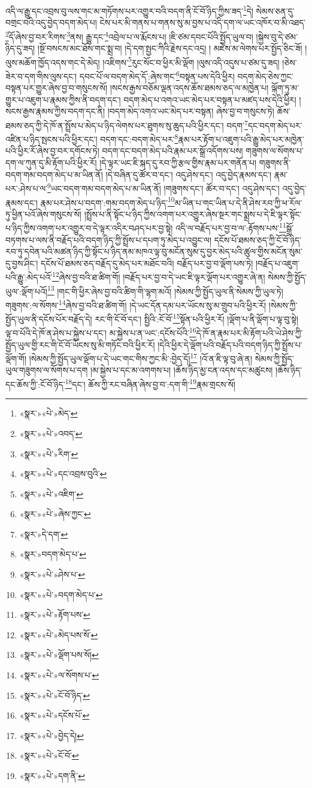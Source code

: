 འདི་ལ་རྒྱུ་དང་འབྲས་བུ་ལས་གང་མ་གཏོགས་པར་འགྱུར་བའི་བདག་ནི་ངོ་བོ་ཉིད་ཀྱིས་ཟད་\footnote{«སྣར་»«པེ་»མེད་}དེ། སེམས་ཅན་དུ་བགྲང་བའི་འདུ་བྱེད་བདག་མེད་པ། ངེས་པར་མི་གནས་པ་གནས་སུ་མ་བྱས་པ་འདི་དག་ལ་ཡང་འཁོར་བ་མི་འཐད་\footnote{«སྣར་»«པེ་»འབད་}དོ་ཞེས་བྱ་བར་རིགས་\footnote{«སྣར་»«པེ་»རིག་}ནས། རྒྱུ་དང་\footnote{«སྣར་»«པེ་»དང་འབྲས་བུའི་}འབྲེལ་པ་ལ་རྨོངས་པ། །ཇི་ཙམ་དབང་པོའི་སྤྱོད་ཡུལ་བ། །སྐྱེས་བུ་དེ་ཙམ་ཉིད་དུ་ཟད། །སྔོ་བསངས་མང་ཐོས་གང་སྨྲ་བ། །དེ་དག་སྤྱང་ཀིའི་རྗེས་དང་འདྲ། །
མཛེས་མ་ལེགས་པར་སྤྱོད་ཅིང་ཟོ། །ལུས་མཆོག་ཁྱོད་འདས་གང་དེ་མེད། །འཇིགས་\footnote{«སྣར་»«པེ་»འཇིག་}རུང་སོང་བ་ཕྱིར་མི་ལྡོག །ལུས་འདི་འདུས་པ་ཙམ་དུ་ཟད། །ཅེས་ཟེར་བ་དག་གིས་ལུས་དང་། དབང་པོ་ལ་བདག་མེད་དོ་:ཞེས་གང་\footnote{«སྣར་»«པེ་»ཞེས་ཀྱང་}བསྟན་པས་དེའི་ཕྱིར། བདག་མེད་ཅེས་ཀྱང་བསྟན་པར་གྱུར་ཞེས་བྱ་བ་གསུངས་སོ། །སངས་རྒྱས་བཅོམ་ལྡན་འདས་ཆོས་ཐམས་ཅད་ལ་མཁྱེན་པ། ལྐོག་ཏུ་མ་གྱུར་པ་འཇུག་པ་རྣམས་ཀྱིས་ནི་བདག་དང་། བདག་མེད་པ་འགའ་ཡང་མེད་པར་བསྟན་པ་མཛད་པས་དེའི་ཕྱིར། །སངས་རྒྱས་རྣམས་ཀྱིས་བདག་དང་ནི། །བདག་མེད་འགའ་ཡང་མེད་པར་བསྟན། ཞེས་བྱ་བ་གསུངས་ཏེ། ཆོས་ཐམས་ཅད་ཀྱི་དེ་ཁོ་ན་སྤྲོས་པ་མེད་པ་ཉིད་ལེགས་པར་ཐུགས་སུ་ཆུད་པའི་ཕྱིར་དང་། བདག་\footnote{«སྣར་»དེ་དག་}དང་བདག་མེད་པར་འཛིན་པ་ཉིད་སྤངས་པའི་ཕྱིར་དང་། བདག་དང་:བདག་མེད་པར་\footnote{«སྣར་»བདག་མེད་པ་}རྣམ་པར་རྟོག་པ་འཇུག་པའི་རྒྱུ་མེད་པར་མཁྱེན་པའི་ཕྱིར་རོ་ཞེས་བྱ་བར་དགོངས་ཏེ། བདག་དང་བདག་མེད་པའི་རྣམ་པར་སྒྲོ་འདོགས་པས། གཟུགས་ལ་སོགས་པ་དག་ལ་ཀུན་དུ་མི་རྟོག་པའི་ཕྱིར་རོ། །དེ་ལྟར་ཡང་ཇི་སྐད་དུ་རབ་ཀྱི་རྩལ་གྱིས་རྣམ་པར་གནོན་པ། གཟུགས་ནི་བདག་གམ་བདག་མེད་པ་མ་ཡིན་ནོ། །དེ་བཞིན་དུ་ཚོར་བ་དང་། འདུ་ཤེས་དང་། འདུ་བྱེད་རྣམས་དང་། རྣམ་པར་:ཤེས་པ་ལ་\footnote{«སྣར་»«པེ་»ཤེས་པ་}ཡང་བདག་གམ་བདག་མེད་པ་མ་ཡིན་ནོ། །གཟུགས་དང་། ཚོར་བ་དང་། འདུ་ཤེས་དང་། འདུ་བྱེད་རྣམས་དང་། རྣམ་པར་ཤེས་པ་བདག་:གམ་བདག་མེད་པ་ཉིད་\footnote{«སྣར་»«པེ་»བདག་མེད་པ་}མ་ཡིན་པ་གང་ཡིན་པ་དེ་ནི་ཤེས་རབ་ཀྱི་ཕ་རོལ་ཏུ་ཕྱིན་པའོ་ཞེས་གསུངས་སོ། །སྤྲོས་པ་ནི་སྟོང་པ་ཉིད་ཀྱིས་འགག་པར་འགྱུར་ཞེས་སྔར་གང་སྨྲས་པ་དེ་ཇི་ལྟར་སྟོང་པ་ཉིད་ཀྱིས་འགག་པར་འགྱུར་བ་དེ་ལྟར་འདིར་བཤད་པར་བྱ་སྟེ། འདི་ལ་བརྗོད་པར་བྱ་བ་ལ་:རྟོགས་པས་\footnote{«སྣར་»«པེ་»རྟོག་པས་}སྒྲོ་བཏགས་པ་ལས་ནི་བརྗོད་པའི་བདག་ཉིད་ཀྱི་སྤྲོས་པ་དཔག་ཏུ་མེད་པ་འབྱུང་ལ། དངོས་པོ་ཐམས་ཅད་ཀྱི་ངོ་བོ་ཉིད་རབ་ཏུ་དབེན་པའི་མཚན་ཉིད་ཀྱི་སྟོང་པ་ཉིད་ནམ་མཁའ་ལྟ་བུ་མངོན་སུམ་དུ་བྱར་མེད་པའི་ཚུལ་གྱིས་མངོན་སུམ་དུ་བྱས་ཤིང་། དངོས་པོ་ཐམས་ཅད་བརྗོད་དུ་མེད་པར་མཐོང་བའི། བརྗོད་པར་བྱ་བ་ལྡོག་པས་ཏེ། །བརྗོད་པ་འཇུག་པའི་རྒྱུ་:མེད་པའོ་\footnote{«སྣར་»«པེ་»མེད་པས་སོ་}ཞེས་བྱ་བའི་ཐ་ཚིག་གོ། །བརྗོད་པར་བྱ་བ་དེ་ཡང་ཇི་ལྟར་ལྡོག་པར་འགྱུར་ཞེ་ན། སེམས་ཀྱི་སྤྱོད་ཡུལ་:ལྡོག་པའོ།\footnote{«སྣར་»«པེ་»ལྡོག་པས་སོ།} །གང་གི་ཕྱིར་ཞེས་བྱ་བའི་ཚིག་གི་ལྷག་མའོ། །སེམས་ཀྱི་སྤྱོད་ཡུལ་ནི་སེམས་ཀྱི་ཡུལ་ཏེ། གཟུགས་:ལ་སོགས་\footnote{«སྣར་»«པེ་»ལ་སོགས་པ་}ཞེས་བྱ་བའི་ཐ་ཚིག་གོ། །དེ་ཡང་དོན་དམ་པར་ཡོངས་སུ་མ་གྲུབ་པའི་ཕྱིར་རོ། །སེམས་ཀྱི་སྤྱོད་ཡུལ་ནི་དངོས་པོར་བརྗོད་དེ། རང་གི་ངོ་བོ་དང་། སྤྱིའི་:ངོ་བོ་\footnote{«སྣར་»«པེ་»ངོ་བོ་ཉིད་}སྟོན་པའི་ཕྱིར་རོ། །ལྡོག་པ་ནི་ལྡོག་པ་ལྟ་བུ་སྟེ། ལྟ་བ་པོའི་དེ་ཁོ་ན་ཤེས་པ་སྐྱེས་པ་དང་། མ་སྐྱེས་པ་ན་ཡང་:དངོས་པོའི་\footnote{«སྣར་»«པེ་»དངོས་པོ་}དེ་ཁོ་ན་རྣམ་པར་མི་རྟོག་པའི་ཡེ་ཤེས་ཀྱི་སྤྱོད་ཡུལ་གྱི་རང་གི་ངོ་བོ་ཡོངས་སུ་མི་གཏོང་བའི་ཕྱིར་རོ། །དེའི་ཕྱིར་དེ་ལྡོག་པའི་བརྗོད་པའི་བདག་ཉིད་ཀྱི་སྤྲོས་པ་ལྡོག་གོ། །སེམས་ཀྱི་སྤྱོད་ཡུལ་ལྡོག་པ་དེ་ཡང་གང་གིས་ཀྱང་མི་:བྱེད་དོ།\footnote{«སྣར་»«པེ་»བྱེད་དེ།} །འོ་ན་ཇི་ལྟ་བུ་ཞེ་ན། སེམས་ཀྱི་སྤྱོད་ཡུལ་གཟུགས་ལ་སོགས་པ་དག །མ་སྐྱེས་པ་དང་མ་འགགས་པ། །ཆོས་ཉིད་མྱ་ངན་འདས་དང་མཚུངས། །ཆོས་ཉིད་དང་ཆོས་ཀྱི་:ངོ་བོ་ཉིད་\footnote{«སྣར་»«པེ་»ངོ་བོ་}དང་། ཆོས་ཀྱི་རང་བཞིན་ཞེས་བྱ་བ་:དག་གི་\footnote{«སྣར་»«པེ་»དག་ནི་}རྣམ་གྲངས་སོ། 